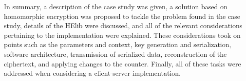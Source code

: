 
In summary, a description of the case study was given, a solution based on homomorphic encryption was proposed to tackle the problem found in the case study, details of the HElib were discussed, and all of the relevant considerations pertaining to the implementation were explained. These considerations took on points such as the parameters and context, key generation and serialization, software architecture, transmission of serialized data, reconstruction of the ciphertext, and applying changes to the counter. Finally, all of these tasks were addressed when considering a client-server implementation.

\clearpage
